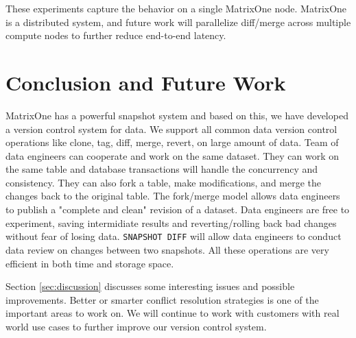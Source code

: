 \documentclass[sigconf,nonacm]{acmart} %
\begin{document}
These experiments capture the behavior on a single MatrixOne node.
MatrixOne is a distributed system, and future work will parallelize
diff/merge across multiple compute nodes to further reduce end-to-end
latency.

\section{Conclusion and Future Work}
MatrixOne has a powerful snapshot system and based on this, we have 
developed a version control system for data.  We support all common
data version control operations like clone, tag, diff, merge, 
revert, on large amount of data.  Team of data engineers can cooperate 
and work on the same dataset.  They can work on the same table and
database transactions will handle the concurrency and consistency.
They can also fork a table, make modifications, and merge the changes 
back to the original table.   The fork/merge model allows data
engineers to publish a "complete and clean" revision of a dataset.
Data engineers are free to experiment, saving intermidiate results
and reverting/rolling back bad changes without fear of losing data.
\texttt{SNAPSHOT DIFF} will allow data engineers to conduct 
data review on changes between two snapshots.  All these operations
are very efficient in both time and storage space.

Section \ref{sec:discussion} discusses some interesting issues 
and possible improvements.  Better or smarter conflict 
resolution strategies is one of the important areas to work on.
We will continue to work with customers with real world use 
cases to further improve our version control system.  
\end{document}
